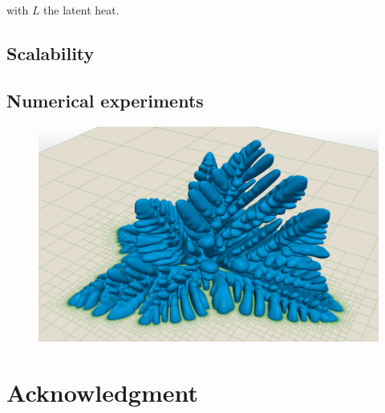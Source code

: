 \documentclass{elsarticle}
\begin{document}
with $L$ the latent heat.

\subsection{Scalability}

\subsection{Numerical experiments}

\begin{figure}[ht!]
\begin{center}
\includegraphics[width=.8\textwidth]{pictures/crystal_grid_low.png}
\end{center}
\end{figure}

\section{Acknowledgment} 

\newpage

\end{document}
